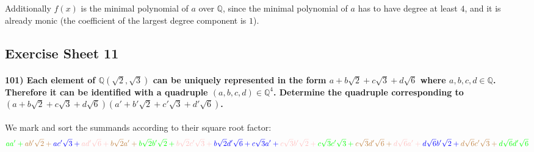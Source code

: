 \documentclass[
]{article}
\begin{document}
Additionally \(f(x)\) is the minimal polynomial of \(a\) over
\(\mathbb{Q}\), since the minimal polynomial of \(a\) has to have degree
at least \(4\), and it is already monic (the coefficient of the largest
degree component is \(1\)).

\hypertarget{exercise-sheet-11}{%
\subsection{Exercise Sheet 11}\label{exercise-sheet-11}}

\hypertarget{each-element-of-mathbbqsqrt2-sqrt3-can-be-uniquely-represented-in-the-form-a-bsqrt2-c-sqrt3-dsqrt6-where-abcd-in-mathbbq.-therefore-it-can-be-identified-with-a-quadruple-abcd-in-mathbbq4.-determine-the-quadruple-corresponding-to-a-bsqrt2-c-sqrt3-dsqrt6a-b-sqrt2-c-sqrt3-d-sqrt6.}{%
\paragraph{\texorpdfstring{101) Each element of
\(\mathbb{Q}(\sqrt{2}, \sqrt{3})\) can be uniquely represented in the
form \(a + b\sqrt{2} + c \sqrt{3} + d\sqrt{6}\) where
\(a,b,c,d \in \mathbb{Q}\). Therefore it can be identified with a
quadruple \((a,b,c,d) \in \mathbb{Q}^4\). Determine the quadruple
corresponding to
\((a + b\sqrt{2} + c \sqrt{3} + d\sqrt{6})(a' + b' \sqrt{2} + c' \sqrt{3} + d' \sqrt{6})\).}{101) Each element of \textbackslash mathbb\{Q\}(\textbackslash sqrt\{2\}, \textbackslash sqrt\{3\}) can be uniquely represented in the form a + b\textbackslash sqrt\{2\} + c \textbackslash sqrt\{3\} + d\textbackslash sqrt\{6\} where a,b,c,d \textbackslash in \textbackslash mathbb\{Q\}. Therefore it can be identified with a quadruple (a,b,c,d) \textbackslash in \textbackslash mathbb\{Q\}\^{}4. Determine the quadruple corresponding to (a + b\textbackslash sqrt\{2\} + c \textbackslash sqrt\{3\} + d\textbackslash sqrt\{6\})(a\textquotesingle{} + b\textquotesingle{} \textbackslash sqrt\{2\} + c\textquotesingle{} \textbackslash sqrt\{3\} + d\textquotesingle{} \textbackslash sqrt\{6\}).}}\label{each-element-of-mathbbqsqrt2-sqrt3-can-be-uniquely-represented-in-the-form-a-bsqrt2-c-sqrt3-dsqrt6-where-abcd-in-mathbbq.-therefore-it-can-be-identified-with-a-quadruple-abcd-in-mathbbq4.-determine-the-quadruple-corresponding-to-a-bsqrt2-c-sqrt3-dsqrt6a-b-sqrt2-c-sqrt3-d-sqrt6.}}

We mark and sort the summands according to their square root factor: \[
\color{green}{aa'} + \color{brown}{ab'\sqrt{2}} + \color{blue}{ac'\sqrt{3}} + \color{pink}{ad'\sqrt{6}} + \color{brown}{b\sqrt{2}a'} + \color{green}{b\sqrt{2}b'\sqrt{2}} + \color{pink}{b\sqrt{2}c'\sqrt{3}} + \color{blue}{b\sqrt{2}d'\sqrt{6}} + \\
\color{blue}{c\sqrt{3}a'} + \color{pink}{c\sqrt{3}b'\sqrt{2}} + \color{green}{c \sqrt{3} c'\sqrt{3}} + \color{brown}{c\sqrt{3}d'\sqrt{6}} + \color{pink}{d\sqrt{6}a'} + \color{blue}{d\sqrt{6} b'\sqrt{2}} + \color{brown}{d\sqrt{6} c' \sqrt{3}} + \color{green}{d\sqrt{6} d' \sqrt{6}} 
\]
\end{document}

